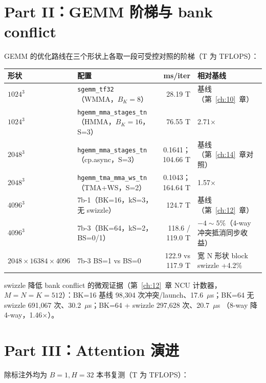 \section{Part II：GEMM 阶梯与 bank conflict}

GEMM 的优化路线在三个形状上各取一段可受控对照的阶梯（T 为 TFLOPS）：

\begin{center}\small
\begin{tabular}{lp{5.2cm}rp{2.6cm}}
\toprule
形状 & 配置 & ms/iter & 相对基线 \\
\midrule
$1024^3$ & \texttt{sgemm\_tf32}（WMMA，$B_K{=}8$） & 28.19 T & 基线（第~\ref{ch:10}~章） \\
$1024^3$ & \texttt{hgemm\_\allowbreak{}mma\_\allowbreak{}stages\_\allowbreak{}tn}（HMMA，$B_K{=}16$，S=3） & 76.55 T & 2.71$\times$ \\
$2048^3$ & \texttt{hgemm\_\allowbreak{}mma\_\allowbreak{}stages\_\allowbreak{}tn}（cp.async，S=3） & 0.1641；104.66 T & 基线（第~\ref{ch:14}~章对照） \\
$2048^3$ & \texttt{hgemm\_\allowbreak{}tma\_\allowbreak{}mma\_\allowbreak{}ws\_\allowbreak{}tn}（TMA+WS，S=2） & 0.1043；164.64 T & 1.57$\times$ \\
$4096^3$ & 7b-1（BK=16，kS=3，无 swizzle） & 124.7 T & 基线（第~\ref{ch:12}~章） \\
$4096^3$ & 7b-3（BK=64，kS=2，BS=0/1） & 118.6 / 119.0 T & $-4\sim5\%$（4-way 冲突抵消同步收益） \\
$2048{\times}16384{\times}4096$ & 7b-3 BS=1 vs BS=0 & 122.9 vs 117.9 T & 宽 N 形状 block swizzle +4.2\% \\
\bottomrule
\end{tabular}
\end{center}

swizzle 降低 bank conflict 的微观证据（第~\ref{ch:12}~章 NCU 计数器，
$M{=}N{=}K{=}512$）：BK=16 基线 98{,}304 次冲突/launch、17.6~$\mu$s；BK=64 无
swizzle 691{,}067 次、30.2~$\mu$s；BK=64 + swizzle 297{,}628 次、20.7~$\mu$s
（8-way 降 4-way，1.46$\times$）。

\section{Part III：Attention 演进}

除标注外均为 $B{=}1, H{=}32$ 本书复测（T 为 TFLOPS）：

